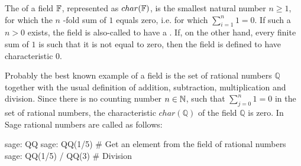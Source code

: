The  of a field $ \mathbb{F} $, represented as $char(\mathbb{F})$, is the smallest natural number $ n \geq 1 $, for which the $ n $ -fold sum of $ 1 $ equals zero, i.e. for which $ \sum_{i = 1} ^ n 1 = 0 $. If such a $ n> 0 $ exists, the field is also-called to have a . If, on the other hand, every finite sum of $1$ is such that it is not equal to zero, then the field is defined to have characteristic $ 0 $. 
\begin{example} Probably the best known example of a field is the set of rational numbers $\mathbb{Q}$ together with the usual definition of addition, subtraction, multiplication and division. Since there is no counting number $n\in \mathbb{N}$, such that $\sum_{j=0}^n 1 =0$ in the set of rational numbers, the characteristic $char(\mathbb{Q})$ of the field $\mathbb{Q}$ is zero. In Sage rational numbers are called as follows:
\begin{sagecommandline}
sage: QQ
sage: QQ(1/5) # Get an element from the field of rational numbers
sage: QQ(1/5) / QQ(3) # Division
\end{sagecommandline}
\end{example}
